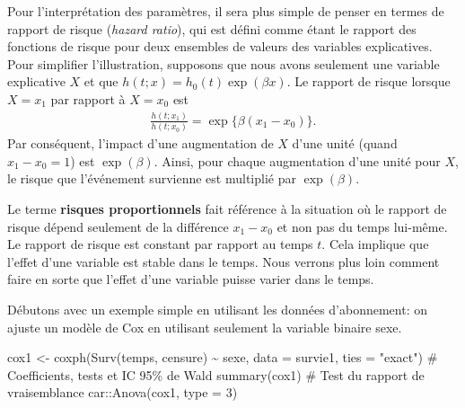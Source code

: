 \documentclass[
  11pt,
  letterpaper,
]{book}
\newenvironment{Shaded}{\begin{snugshade}}{\end{snugshade}}
\newcommand{\AttributeTok}[1]{\textcolor[rgb]{0.40,0.45,0.13}{#1}}
\newcommand{\CommentTok}[1]{\textcolor[rgb]{0.37,0.37,0.37}{#1}}
\newcommand{\DecValTok}[1]{\textcolor[rgb]{0.68,0.00,0.00}{#1}}
\newcommand{\FunctionTok}[1]{\textcolor[rgb]{0.28,0.35,0.67}{#1}}
\newcommand{\NormalTok}[1]{\textcolor[rgb]{0.00,0.23,0.31}{#1}}
\newcommand{\OtherTok}[1]{\textcolor[rgb]{0.00,0.23,0.31}{#1}}
\newcommand{\SpecialCharTok}[1]{\textcolor[rgb]{0.37,0.37,0.37}{#1}}
\newcommand{\StringTok}[1]{\textcolor[rgb]{0.13,0.47,0.30}{#1}}
\theoremstyle{definition}
\theoremstyle{remark}
\begin{document}
Pour l'interprétation des paramètres, il sera plus simple de penser en
termes de rapport de risque (\emph{hazard ratio}), qui est défini comme
étant le rapport des fonctions de risque pour deux ensembles de valeurs
des variables explicatives. Pour simplifier l'illustration, supposons
que nous avons seulement une variable explicative \(X\) et que
\(h(t; x) = h_0(t)\exp(\beta x)\). Le rapport de risque lorsque
\(X=x_1\) par rapport à \(X=x_0\) est \begin{align*}
\frac{h(t; x_1)}{h(t; x_0)} = \exp\{\beta(x_1-x_0)\}.
\end{align*} Par conséquent, l'impact d'une augmentation de \(X\) d'une
unité (quand \(x_1-x_0=1\)) est \(\exp(\beta)\). Ainsi, pour chaque
augmentation d'une unité pour \(X\), le risque que l'événement survienne
est multiplié par \(\exp(\beta)\).

Le terme \textbf{risques proportionnels} fait référence à la situation
où le rapport de risque dépend seulement de la différence \(x_1-x_0\) et
non pas du temps lui-même. Le rapport de risque est constant par rapport
au temps \(t\). Cela implique que l'effet d'une variable est stable dans
le temps. Nous verrons plus loin comment faire en sorte que l'effet
d'une variable puisse varier dans le temps.

Débutons avec un exemple simple en utilisant les données d'abonnement:
on ajuste un modèle de Cox en utilisant seulement la variable binaire
sexe.

\begin{Shaded}
\begin{Highlighting}[]
\NormalTok{cox1 }\OtherTok{\textless{}{-}} \FunctionTok{coxph}\NormalTok{(}\FunctionTok{Surv}\NormalTok{(temps, censure) }\SpecialCharTok{\textasciitilde{}}\NormalTok{ sexe, }
              \AttributeTok{data =}\NormalTok{ survie1,}
              \AttributeTok{ties =} \StringTok{"exact"}\NormalTok{)}
\CommentTok{\# Coefficients, tests et IC 95\% de Wald}
\FunctionTok{summary}\NormalTok{(cox1)}
\CommentTok{\# Test du rapport de vraisemblance}
\NormalTok{car}\SpecialCharTok{::}\FunctionTok{Anova}\NormalTok{(cox1, }\AttributeTok{type =} \DecValTok{3}\NormalTok{)}
\end{Highlighting}
\end{Shaded}
\end{document}
